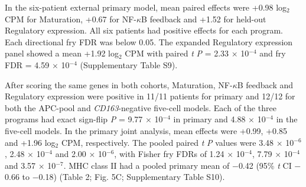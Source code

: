 \documentclass[11pt,a4paper]{article}
\begin{document}
In the six-patient external primary model, mean paired effects were +0.98 log$_{2}$ CPM for Maturation, +0.67 for NF-$\kappa$B feedback and +1.52 for held-out Regulatory expression. All six patients had positive effects for each program. Each directional fry FDR was below 0.05. The expanded Regulatory expression panel showed a mean +1.92 log$_{2}$ CPM with paired \textit{t} \textit{P} = 2.33 $\times$ 10$^{-4}$ and fry FDR = 4.59 $\times$ 10$^{-4}$ (Supplementary Table S9).

After scoring the same genes in both cohorts, Maturation, NF-$\kappa$B feedback and Regulatory expression were positive in 11/11 patients for primary and 12/12 for both the APC-pool and \textit{CD163}-negative five-cell models. Each of the three programs had exact sign-flip \textit{P} = 9.77 $\times$ 10$^{-4}$ in primary and 4.88 $\times$ 10$^{-4}$ in the five-cell models. In the primary joint analysis, mean effects were +0.99, +0.85 and +1.96 log$_{2}$ CPM, respectively. The pooled paired \textit{t} \textit{P} values were 3.48 $\times$ 10$^{-6}$, 2.48 $\times$ 10$^{-4}$ and 2.00 $\times$ 10$^{-6}$, with Fisher fry FDRs of 1.24 $\times$ 10$^{-4}$, 7.79 $\times$ 10$^{-4}$ and 3.57 $\times$ 10$^{-7}$. MHC class II had a pooled primary mean of $-$0.42 (95\% \textit{t} CI $-$0.66 to $-$0.18) (Table 2; Fig. 5C; Supplementary Table S10).
\end{document}
